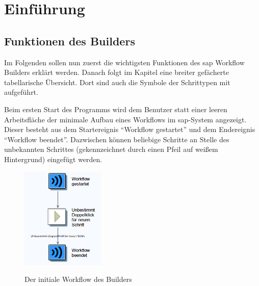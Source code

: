 \section{Einführung}


\subsection{Funktionen des Builders}
\label{sec:builder-funktionen}
Im Folgenden sollen nun zuerst die wichtigsten Funktionen des \gls{sap} Workflow Builders erklärt werden. Danach folgt im Kapitel  eine breiter gefächerte tabellarische Übersicht. Dort sind auch die Symbole der Schrittypen mit aufgeführt. 

Beim ersten Start des Programms wird dem Benutzer statt einer leeren Arbeitsfläche der minimale Aufbau eines Workflows im \gls{sap}-System angezeigt. Dieser besteht aus dem Startereignis "`Workflow gestartet"' und dem Endereignis "`Workflow beendet"'. Dazwischen können beliebige Schritte an Stelle des unbekannten Schrittes (gekennzeichnet durch einen Pfeil auf weißem Hintergrund) eingefügt werden.

\begin{figure}[H]
	\begin{center}
	\includegraphics[width=150px]{grafiken/wf-builder_new-wf.png}
	\caption{Der initiale Workflow des Builders}
	\vspace{-10pt}
	\label{abb:workflow-easy}
	\end{center}
\end{figure}

